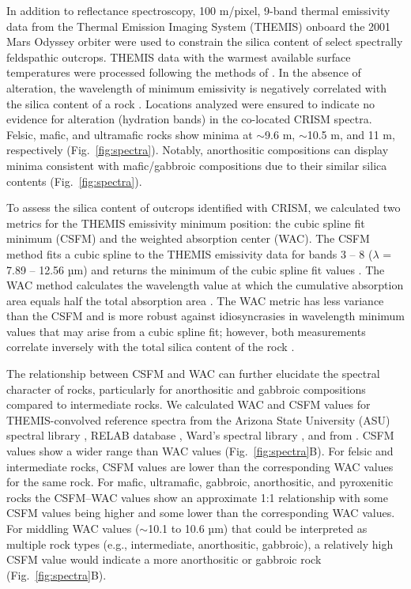 \documentclass[12pt]{article}
\begin{document}
In addition to reflectance spectroscopy, 100 m/pixel, 9-band thermal emissivity data from the Thermal Emission Imaging System (THEMIS) onboard the 2001 Mars Odyssey orbiter \citep{Christensen2004} were used to constrain the silica content of select spectrally feldspathic outcrops. THEMIS data with the warmest available surface temperatures were processed following the methods of \citet{Bandfield2004}. In the absence of alteration, the wavelength of minimum emissivity is negatively correlated with the silica content of a rock \citep{Lyon1965}. Locations analyzed were ensured to indicate no evidence for alteration (hydration bands) in the co-located CRISM spectra. Felsic, mafic, and ultramafic rocks show minima at $\sim$9.6 \textmu m, $\sim$10.5 \textmu m, and 11 \textmu m, respectively (Fig.~\ref{fig:spectra}). Notably, anorthositic compositions can display minima consistent with mafic/gabbroic compositions due to their similar silica contents (Fig.~\ref{fig:spectra}).

To assess the silica content of outcrops identified with CRISM, we calculated two metrics for the THEMIS emissivity minimum position: the cubic spline fit minimum (CSFM) and the weighted absorption center (WAC). The CSFM method fits a cubic spline to the THEMIS emissivity data for bands 3 -- 8 ($\lambda$ = 7.89 -- 12.56 µm) and returns the minimum of the cubic spline fit values \citep{Rogers2015}. The WAC method calculates the wavelength value at which the cumulative absorption area equals half the total absorption area \citep{Vincent1972, Smith2013, Amador2016}. The WAC metric has less variance than the CSFM and is more robust against idiosyncrasies in wavelength minimum values that may arise from a cubic spline fit; however, both measurements correlate inversely with the total silica content of the rock \citep{Vincent1972, Walter1989, Rogers2015, Amador2016}.

The relationship between CSFM and WAC can further elucidate the spectral character of rocks, particularly for anorthositic and gabbroic compositions compared to intermediate rocks. We calculated WAC and CSFM values for THEMIS-convolved reference spectra from the Arizona State University (ASU) spectral library \citep{ASUSpecLib2025}, RELAB database \citep{BrownRELAB2025}, Ward's spectral library \citep{Bryson2014}, and from \citet{Dunn2021}. CSFM values show a wider range than WAC values (Fig.~\ref{fig:spectra}B). For felsic and intermediate rocks, CSFM values are lower than the corresponding WAC values for the same rock. For mafic, ultramafic, gabbroic, anorthositic, and pyroxenitic rocks the CSFM--WAC values show an approximate 1:1 relationship with some CSFM values being higher and some lower than the corresponding WAC values. For middling WAC values ($\sim$10.1 to 10.6 µm) that could be interpreted as multiple rock types (e.g., intermediate, anorthositic, gabbroic), a relatively high CSFM value would indicate a more anorthositic or gabbroic rock (Fig.~\ref{fig:spectra}B).
\end{document}
